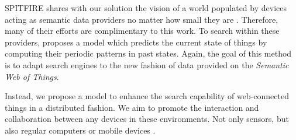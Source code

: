 SPITFIRE shares with our solution the vision of a world populated by devices acting as semantic data providers no matter how small they are \citep{hasemann_rdf_2012}.
Therefore, many of their efforts are complimentary to this work.
To search within these providers, \citet{pfisterer_spitfire:_2011} proposes a model which predicts the current state of things by computing their periodic patterns in past states.
Again, the goal of this method is to adapt search engines to the new fashion of data provided on the \emph{Semantic Web of Things}.

Instead, we propose a model to enhance the search capability of web-connected things in a distributed fashion.
We aim to promote the interaction and collaboration between any devices in these environments.
Not only sensors, but also regular computers or mobile devices \citep{balandin_access_2011}.



